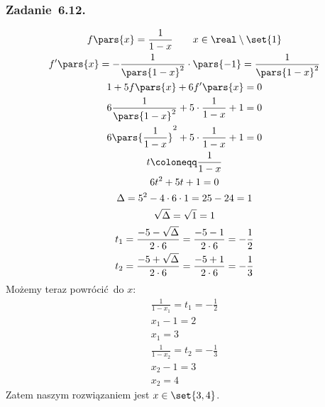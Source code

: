 \subsubsection*{Zadanie~6.12.}
\begin{gather*}
    f\pars{x} = \frac{1}{1 - x} \qquad x \in \real \setminus \set{1}\\
    f'\pars{x} = -\frac{1}{\pars{1 - x}^2} \cdot \pars{-1}
        = \frac{1}{\pars{1 - x}^2}\\
    1 + 5f\pars{x} + 6f'\pars{x} = 0\\
    6\frac{1}{\pars{1 - x}^2} + 5 \cdot \frac{1}{1 - x} + 1 = 0\\
    6\pars{\frac{1}{1 - x}}^2 + 5 \cdot \frac{1}{1 - x} + 1 = 0\\
    t \coloneqq \frac{1}{1 - x}\\
    6t^2 + 5t + 1 = 0\\
    \Delta = 5^2 - 4 \cdot 6 \cdot 1 = 25 - 24 = 1\\
    \sqrt{\Delta} = \sqrt{1} = 1\\
    t_1 = \frac{-5 - \sqrt{\Delta}}{2 \cdot 6} = \frac{-5 - 1}{2 \cdot 6} = -\frac{1}{2}\\
    t_2 = \frac{-5 + \sqrt{\Delta}}{2 \cdot 6} = \frac{-5 + 1}{2 \cdot 6} = -\frac{1}{3}
\end{gather*}
Możemy teraz powrócić do \(x\):
\begin{gather*}
    \frac{1}{1 - x_1} = t_1 = -\frac{1}{2}\\
    x_1 - 1 = 2\\
    x_1 = 3\\
    \frac{1}{1 - x_2} = t_2 = -\frac{1}{3}\\
    x_2 - 1 = 3\\
    x_2 = 4
\end{gather*}
Zatem naszym rozwiązaniem jest \(x \in \set{3, 4}\).
